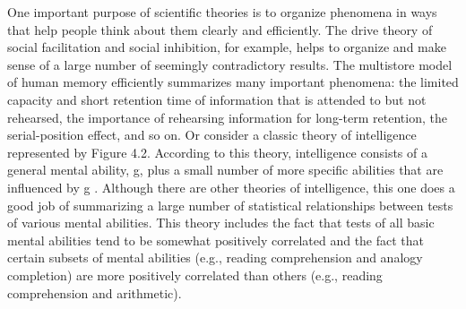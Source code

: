 One important purpose of scientific theories is to organize phenomena in ways that help people think about them clearly and efficiently. The drive theory of social facilitation and social inhibition, for example, helps to organize and make sense of a large number of seemingly contradictory results. The multistore model of human memory efficiently summarizes many important phenomena: the limited capacity and short retention time of information that is attended to but not rehearsed, the importance of rehearsing information for long-term retention, the serial-position effect, and so on. Or consider a classic theory of intelligence represented by Figure 4.2. According to this theory, intelligence consists of a general mental ability, g, plus a small number of more specific abilities that are influenced by g \citep{neisser_intelligence:_1996}. Although there are other theories of intelligence, this one does a good job of summarizing a large number of statistical relationships between tests of various mental abilities. This theory includes the fact that tests of all basic mental abilities tend to be somewhat positively correlated and the fact that certain subsets of mental abilities (e.g., reading comprehension and analogy completion) are more positively correlated than others (e.g., reading comprehension and arithmetic).


